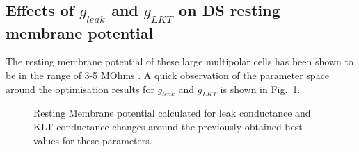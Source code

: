 

\subsection{Effects of $g_{leak}$ and $g_{LKT}$ on DS resting membrane potential}

The resting membrane potential of these large multipolar cells has been shown to be in the range of 3-5 MOhms . A quick observation of the parameter space around the optimisation results for $g_{leak}$ and $g_{LKT}$ is shown in Fig.~\ref{fig:leakVltk}.  

 \begin{figure}[h!]
   \centering
   \caption{Resting Membrane potential calculated for leak conductance and KLT conductance changes around the previously obtained best values for these parameters.}\label{fig:leakVltk}
 \end{figure}


